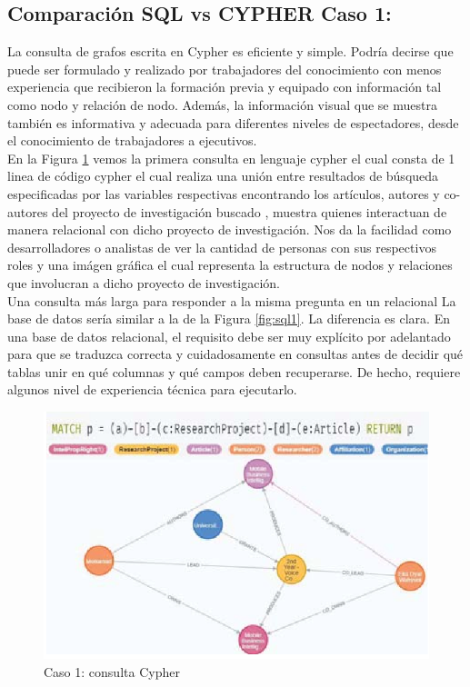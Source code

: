 \subsection{Comparación SQL vs CYPHER Caso 1:}
La consulta de grafos escrita en Cypher es eficiente y simple. Podría decirse que puede ser formulado y realizado por trabajadores del conocimiento con menos experiencia que recibieron la formación previa y equipado con información tal como nodo y relación de nodo.
Además, la información visual que se muestra también es informativa y adecuada para diferentes niveles de espectadores, desde el conocimiento de  trabajadores a ejecutivos.\\
En la Figura \ref{fig:neo1} vemos la primera consulta en lenguaje cypher el cual consta de 1 linea de código cypher el cual realiza una unión entre resultados de búsqueda especificadas por las variables respectivas encontrando los artículos, autores y co-autores del proyecto de investigación buscado , muestra quienes interactuan de manera relacional con dicho proyecto de investigación.
Nos da la facilidad como desarrolladores o analistas de ver la cantidad de personas con sus respectivos roles y una imágen gráfica el cual representa la estructura de nodos y relaciones que involucran a dicho proyecto de investigación.\\
Una consulta más larga para responder a la misma pregunta en un relacional
La base de datos sería similar a la de la Figura \ref{fig:sql1}. La diferencia es clara. En una base de datos relacional, el requisito debe ser muy explícito por adelantado para que se traduzca correcta y cuidadosamente en consultas antes de decidir qué tablas unir en qué columnas y qué campos deben recuperarse. De hecho, requiere algunos nivel de experiencia técnica para ejecutarlo.
    \begin{figure}[H]
    \centering
    \includegraphics[scale=0.8]{Graficos/neo11.png}
    \caption{Caso 1: consulta Cypher}
    \label{fig:neo1}
    \end{figure}
